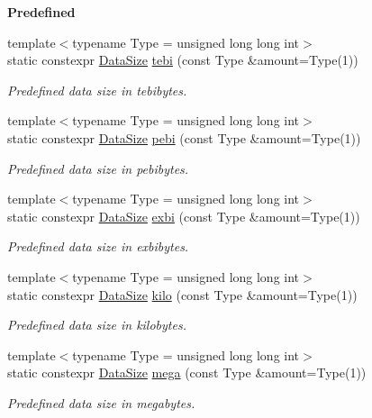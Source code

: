 \begin{Indent}{\bf Predefined}
\begin{DoxyCompactItemize}
{\footnotesize template$<$typename Type  = unsigned long long int$>$ }\\static constexpr \hyperlink{exceptionmagrathea_1_1DataSize}{Data\-Size} \hyperlink{exceptionmagrathea_1_1DataSize_a46fe14cd5bfd609e502fecd6408dd75c}{tebi} (const Type \&amount=Type(1))
\begin{DoxyCompactList}\small\item\em Predefined data size in tebibytes. \end{DoxyCompactList}\item 
{\footnotesize template$<$typename Type  = unsigned long long int$>$ }\\static constexpr \hyperlink{exceptionmagrathea_1_1DataSize}{Data\-Size} \hyperlink{exceptionmagrathea_1_1DataSize_a3452fef4c5afbe4bcf678a469a33582e}{pebi} (const Type \&amount=Type(1))
\begin{DoxyCompactList}\small\item\em Predefined data size in pebibytes. \end{DoxyCompactList}\item 
{\footnotesize template$<$typename Type  = unsigned long long int$>$ }\\static constexpr \hyperlink{exceptionmagrathea_1_1DataSize}{Data\-Size} \hyperlink{exceptionmagrathea_1_1DataSize_af2558af230f37eac2d558ae5a12abb28}{exbi} (const Type \&amount=Type(1))
\begin{DoxyCompactList}\small\item\em Predefined data size in exbibytes. \end{DoxyCompactList}\item 
{\footnotesize template$<$typename Type  = unsigned long long int$>$ }\\static constexpr \hyperlink{exceptionmagrathea_1_1DataSize}{Data\-Size} \hyperlink{exceptionmagrathea_1_1DataSize_a13f28fc15cccb1fb9c6e42a3993af90f}{kilo} (const Type \&amount=Type(1))
\begin{DoxyCompactList}\small\item\em Predefined data size in kilobytes. \end{DoxyCompactList}\item 
{\footnotesize template$<$typename Type  = unsigned long long int$>$ }\\static constexpr \hyperlink{exceptionmagrathea_1_1DataSize}{Data\-Size} \hyperlink{exceptionmagrathea_1_1DataSize_af073dab13fc604a0cff951f46510a35a}{mega} (const Type \&amount=Type(1))
\begin{DoxyCompactList}\small\item\em Predefined data size in megabytes. \end{DoxyCompactList}\item 

\end{DoxyCompactItemize}
\end{Indent}
